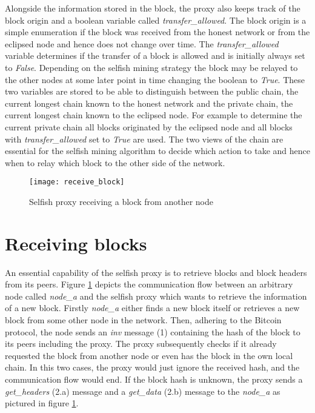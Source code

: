 Alongside the information stored in the block, the proxy also keeps track of the block origin and a boolean variable called \textit{transfer\_allowed}. 
The block origin is a simple enumeration if the block was received from the honest network or from the eclipsed node and hence does not change over time.
The \textit{transfer\_allowed} variable determines if the transfer of a block is allowed and is initially always set to \textit{False}.
Depending on the selfish mining strategy the block may be relayed to the other nodes at some later point in time changing the boolean to \textit{True}.
These two variables are stored to be able to distinguish between the public chain, the current longest chain known to the honest network and the private chain, the current longest chain known to  the eclipsed node.
For example to determine the current private chain all blocks originated by the eclipsed node and all blocks with \textit{transfer\_allowed} set to \textit{True} are used.
The two views of the chain are essential for the selfish mining algorithm to decide which action to take and hence when to relay which block to the other side of the network.

\begin{figure}
	\centering
    \texttt{[image: receive\_block]}
    \caption{Selfish proxy receiving a block from another node}
    \label{fig:receive_block}
\end{figure}

\section{Receiving blocks}
\label{chap:receiving_blocks}

An essential capability of the selfish proxy is to retrieve blocks and block headers from its peers.
Figure \ref{fig:receive_block} depicts the communication flow between an arbitrary node called \textit{node\_a} and the selfish proxy which wants to retrieve the information of a new block.
Firstly \textit{node\_a} either finds a new block itself or retrieves a new block from some other node in the network.
Then, adhering to the Bitcoin protocol, the node sends an \textit{inv} message (1) containing the hash of the block to its peers including the proxy.
The proxy subsequently checks if it already requested the block from another node or even has the block in the own local chain.
In this two cases, the proxy would just ignore the received hash, and the communication flow would end.
If the block hash is unknown, the proxy sends a \textit{get\_headers} (2.a) message and a \textit{get\_data} (2.b) message to the \textit{node\_a} as pictured in figure \ref{fig:receive_block}.

